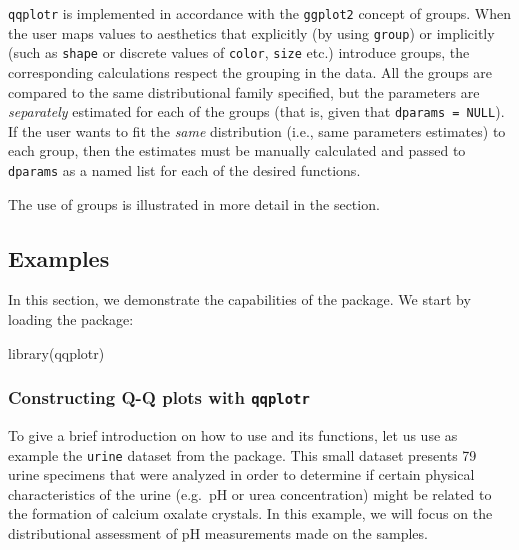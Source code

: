 \texttt{qqplotr} is implemented in accordance with the \texttt{ggplot2}
concept of groups. When the user maps values to aesthetics that
explicitly (by using \texttt{group}) or implicitly (such as
\texttt{shape} or discrete values of \texttt{color}, \texttt{size} etc.)
introduce groups, the corresponding calculations respect the grouping in
the data. All the groups are compared to the same distributional family
specified, but the parameters are \emph{separately} estimated for each
of the groups (that is, given that \texttt{dparams\ =\ NULL}). If the
user wants to fit the \emph{same} distribution (i.e., same parameters
estimates) to each group, then the estimates must be manually calculated
and passed to \texttt{dparams} as a named list for each of the desired
 functions.

The use of groups is illustrated in more detail in the
 section.

\FloatBarrier

\subsection{Examples}\label{examples}

\label{sec:examples}

In this section, we demonstrate the capabilities of the 
package. We start by loading the package:

\begin{Schunk}
\begin{Sinput}
library(qqplotr)
\end{Sinput}
\end{Schunk}

\subsubsection{\texorpdfstring{Constructing Q-Q plots with
\texttt{qqplotr}}{Constructing Q-Q plots with qqplotr}}\label{constructing-q-q-plots-with-qqplotr}

To give a brief introduction on how to use  and its
functions, let us use as example the \texttt{urine} dataset from the
 package. This small dataset presents 79 urine specimens that
were analyzed in order to determine if certain physical characteristics
of the urine (e.g.~pH or urea concentration) might be related to the
formation of calcium oxalate crystals. In this example, we will focus on
the distributional assessment of pH measurements made on the samples.

